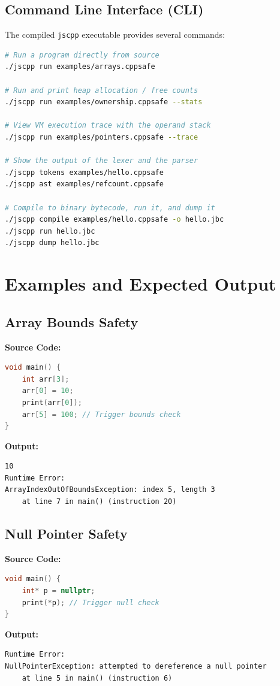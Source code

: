 \documentclass[12pt, a4paper]{article}
\begin{document}
\subsection{Command Line Interface (CLI)}
The compiled \texttt{jscpp} executable provides several commands:
\begin{lstlisting}[language=bash]
# Run a program directly from source
./jscpp run examples/arrays.cppsafe

# Run and print heap allocation / free counts
./jscpp run examples/ownership.cppsafe --stats

# View VM execution trace with the operand stack
./jscpp run examples/pointers.cppsafe --trace

# Show the output of the lexer and the parser
./jscpp tokens examples/hello.cppsafe
./jscpp ast examples/refcount.cppsafe

# Compile to binary bytecode, run it, and dump it
./jscpp compile examples/hello.cppsafe -o hello.jbc
./jscpp run hello.jbc
./jscpp dump hello.jbc
\end{lstlisting}

\section{Examples and Expected Output}

\subsection{Array Bounds Safety}
\textbf{Source Code:}
\begin{lstlisting}[language=C++]
void main() {
    int arr[3];
    arr[0] = 10;
    print(arr[0]);
    arr[5] = 100; // Trigger bounds check
}
\end{lstlisting}
\textbf{Output:}
\begin{lstlisting}
10
Runtime Error:
ArrayIndexOutOfBoundsException: index 5, length 3
    at line 7 in main() (instruction 20)
\end{lstlisting}

\subsection{Null Pointer Safety}
\textbf{Source Code:}
\begin{lstlisting}[language=C++]
void main() {
    int* p = nullptr;
    print(*p); // Trigger null check
}
\end{lstlisting}
\textbf{Output:}
\begin{lstlisting}
Runtime Error:
NullPointerException: attempted to dereference a null pointer
    at line 5 in main() (instruction 6)
\end{lstlisting}
\end{document}
